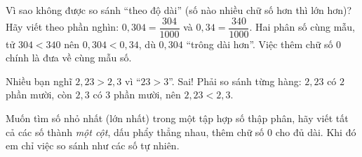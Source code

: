 \begin{proofbox}
Vì sao không được so sánh ``theo độ dài'' (số nào nhiều chữ số hơn thì lớn hơn)? Hãy viết theo phần nghìn:
$0{,}304 = \dfrac{304}{1000}$ và $0{,}34 = \dfrac{340}{1000}$. Hai phân số cùng mẫu, tử $304 < 340$ nên
$0{,}304 < 0{,}34$, dù $0{,}304$ ``trông dài hơn''. Việc thêm chữ số $0$ chính là đưa về cùng mẫu số.
\end{proofbox}
\begin{warnbox}
Nhiều bạn nghĩ $2{,}23 > 2{,}3$ vì ``$23 > 3$''. Sai! Phải so sánh từng hàng: $2{,}23$ có $2$ phần mười,
còn $2{,}3$ có $3$ phần mười, nên $2{,}23 < 2{,}3$.
\end{warnbox}
\begin{tipbox}
Muốn tìm số nhỏ nhất (lớn nhất) trong một tập hợp số thập phân, hãy viết tất cả các số thành \emph{một cột}, dấu phẩy
thẳng nhau, thêm chữ số $0$ cho đủ dài. Khi đó em chỉ việc so sánh như các số tự nhiên.
\end{tipbox}

